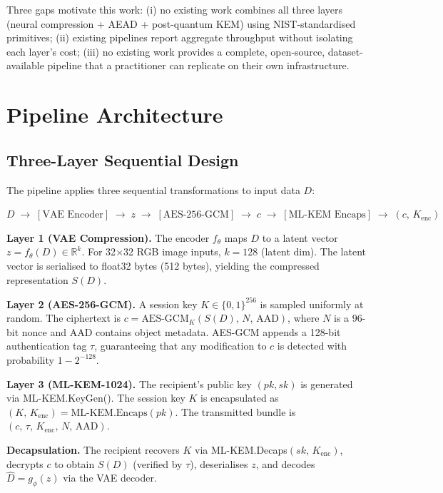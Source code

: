 \documentclass[twocolumn]{article}
\begin{document}
Three gaps motivate this work: (i) no existing work combines all three layers
(neural compression + AEAD + post-quantum KEM) using NIST-standardised
primitives; (ii) existing pipelines report aggregate throughput without isolating
each layer's cost; (iii) no existing work provides a complete, open-source,
dataset-available pipeline that a practitioner can replicate on their own
infrastructure.

\section{Pipeline Architecture}

\subsection{Three-Layer Sequential Design}

The pipeline applies three sequential transformations to input data $D$:

\medskip
$D \;\longrightarrow\; [\text{VAE Encoder}] \;\longrightarrow\; z \;\longrightarrow\; [\text{AES-256-GCM}] \;\longrightarrow\; c \;\longrightarrow\; [\text{ML-KEM Encaps}] \;\longrightarrow\; (c,\,K_\text{enc})$
\medskip

\textbf{Layer 1 (VAE Compression).} The encoder $f_\theta$ maps $D$ to a latent
vector $z = f_\theta(D) \in \mathbb{R}^k$. For 32$\times$32 RGB image inputs,
$k = 128$ (latent dim). The latent vector is serialised to float32 bytes (512
bytes), yielding the compressed representation $S(D)$.

\textbf{Layer 2 (AES-256-GCM).} A session key $K \in \{0,1\}^{256}$ is sampled
uniformly at random. The ciphertext is $c = \text{AES-GCM}_K(S(D),\,N,\,\text{AAD})$,
where $N$ is a 96-bit nonce and AAD contains object metadata. AES-GCM appends a
128-bit authentication tag $\tau$, guaranteeing that any modification to $c$ is
detected with probability $1 - 2^{-128}$.

\textbf{Layer 3 (ML-KEM-1024).} The recipient's public key $(pk, sk)$ is
generated via ML-KEM.KeyGen(). The session key $K$ is encapsulated as
$(K,\,K_\text{enc}) = \text{ML-KEM.Encaps}(pk)$. The transmitted bundle is
$(c,\,\tau,\,K_\text{enc},\,N,\,\text{AAD})$.

\textbf{Decapsulation.} The recipient recovers $K$ via
ML-KEM.Decaps$(sk,\,K_\text{enc})$, decrypts $c$ to obtain $S(D)$ (verified by
$\tau$), deserialises $z$, and decodes $\hat{D} = g_\phi(z)$ via the VAE decoder.
\end{document}
